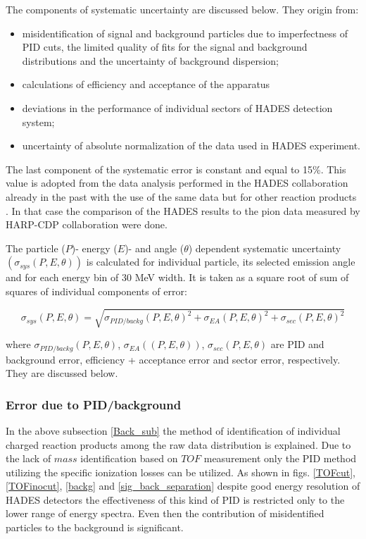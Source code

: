 The components of systematic uncertainty are discussed below. They origin from:
\begin{itemize}
	\item misidentification of signal and background particles 
	due to imperfectness of PID cuts, the limited quality of fits for the signal and background distributions 
	and the uncertainty of background dispersion; 
	\item calculations of efficiency and acceptance of the apparatus
	\item deviations in the performance  of individual sectors of HADES detection system;
	\item uncertainty of absolute normalization of the data used in HADES experiment.  
\end{itemize}

The last component of the systematic error is constant and equal to 15\%.
This value is adopted from the data analysis performed in the HADES collaboration already 
in the past with the use of the same data but for other reaction products \cite{AgakishievPionP,Tlusty}.
In that case the comparison of the HADES results to the pion data measured by HARP-CDP collaboration \cite{Tlusty} 
were done.

The particle ($P$)- energy ($E$)- and  angle ($\theta$) dependent systematic uncertainty $(\sigma_{sys}(P, E,  \theta))$ is calculated for individual particle, 
its selected emission angle and for each energy bin of 30 MeV width.
It is taken as a square root of sum of squares of individual components of error: 

\begin{equation}\label{Sys_error}
    \sigma_{sys}(P, E, \theta ) =  \sqrt{\sigma_{PID/backg}(P, E, \theta )^2 + \sigma_{EA}(P, E, \theta )^2+\sigma_{sec}(P, E, \theta )^2}
\end{equation}

where $\sigma_{PID/backg}(P, E, \theta)$,  $\sigma_{EA}((P, E, \theta ))$, $\sigma_{sec}(P, E, \theta )$ are  PID and background error, efficiency + acceptance error and  sector error, respectively. 
They are discussed below.


\subsubsection{Error due to PID/background}
\label{pid/back}

In the above subsection \ref{Back_sub} the method of identification of individual charged reaction products 
among the raw data distribution is explained. Due to the lack of $mass$ identification based on $TOF$ measurement 
only the PID method utilizing the specific ionization losses can be utilized. As shown in figs. \ref{TOFcut}, 
\ref{TOFinocut}, \ref{backg} and \ref{sig_back_separation} despite good energy resolution of HADES detectors 
the effectiveness of this kind of PID is restricted only to the lower range of energy spectra. 
Even then the contribution of misidentified particles to the background is significant. 

